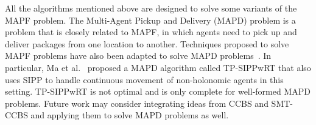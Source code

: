 \documentclass[review]{elsarticle}
\newcommand\konstantin[1]{\nb{\textbf{Konstantin:}}{red}{#1}}
\newcommand\roni[1]{\nb{\textbf{Roni:}}{green}{#1}}
\newcommand\pavel[1]{\nb{\textbf{Pavel:}}{blue}{#1}}
\newcommand{\ccbs}{\ac{CCBS}\xspace}
\newcommand{\sipp}{\ac{SIPP}\xspace}
\newcommand{\smtccbs}{SMT-CCBS\xspace}
\newcommand{\mapf}{\ac{MAPF}\xspace}
\newcommand{\shortcite}{\cite}
\begin{document}
All the algorithms mentioned above are designed to solve some variants of the \mapf problem. 
The Multi-Agent Pickup and Delivery (MAPD) problem is a problem that is closely related to \mapf, in which agents need to pick up and deliver packages from one location to another. Techniques proposed to solve \mapf problems have also been adapted to solve MAPD problems~\cite{ma2017lifelong,LiuAAMAS19,ma2019lifelong}. 
In particular, Ma et al.~\shortcite{ma2019lifelong} proposed a MAPD algorithm called TP-SIPPwRT that also uses \sipp to handle continuous movement of non-holonomic agents in this setting. TP-SIPPwRT is not optimal and is only complete for well-formed MAPD problems. Future work may consider integrating ideas from \ccbs and \smtccbs and applying them to solve MAPD problems as well. 






\end{document}

